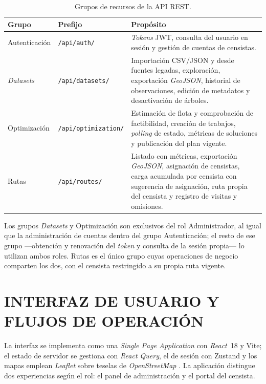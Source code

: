 \begin{table}[H]
  \centering
\caption{Grupos de recursos de la API REST.}
  \label{tab:endpoints}
  \small
  \begin{tabularx}{\textwidth}{@{}l l X@{}}
    \toprule
    Grupo &
      Prefijo &
      Propósito \\
    \midrule
    Autenticación &
      \texttt{/api/auth/} &
      \textit{Tokens} JWT, consulta del usuario en sesión y gestión de cuentas de censistas. \\
    \textit{Datasets} &
      \texttt{/api/datasets/} &
      Importación CSV/JSON y desde fuentes legadas, exploración, exportación \textit{GeoJSON},
      historial de observaciones, edición de metadatos y desactivación de árboles. \\
    Optimización &
      \texttt{/api/optimization/} &
      Estimación de flota y comprobación de factibilidad, creación de trabajos, \textit{polling} de
      estado, métricas de soluciones y publicación del plan vigente. \\
    Rutas &
      \texttt{/api/routes/} &
      Listado con métricas, exportación \textit{GeoJSON}, asignación de censistas, carga acumulada
      por censista con sugerencia de asignación, ruta propia del censista y registro de visitas y
      omisiones. \\
    \bottomrule
  \end{tabularx}
\end{table}

Los grupos \textit{Datasets} y Optimización son exclusivos del rol Administrador, al igual que la
administración de cuentas dentro del grupo Autenticación; el resto de ese grupo ---obtención y
renovación del \textit{token} y consulta de la sesión propia--- lo utilizan ambos roles. Rutas es el
único grupo cuyas operaciones de negocio comparten los dos, con el censista restringido a su propia
ruta vigente.

\section{INTERFAZ DE USUARIO Y FLUJOS DE OPERACIÓN}
\label{sec:ui}

La interfaz se implementa como una \textit{Single Page Application} con \textit{React}~18 y Vite;
el estado de servidor se gestiona con \textit{React Query}, el de sesión con Zustand y los mapas
emplean \textit{Leaflet} sobre teselas de \textit{OpenStreetMap} \citep{openstreetmap}. La
aplicación distingue dos experiencias según el rol: el panel de administración y el portal del
censista.

